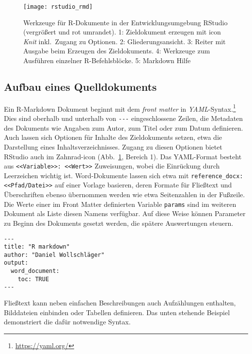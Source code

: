 \begin{figure}[ht]
\centering
\texttt{[image: rstudio\_rmd]}
\vspace*{-0.5em}
\caption{Werkzeuge für R-Dokumente in der Entwicklungsumgebung RStudio (vergrößert und rot umrandet). 1: Zieldokument erzeugen mit icon \emph{Knit} inkl.\ Zugang zu Optionen. 2: Gliederungsansicht. 3: Reiter mit Ausgabe beim Erzeugen des Zieldokuments. 4: Werkzeuge zum Ausführen einzelner R-Befehlsblöcke. 5: Markdown Hilfe}
\label{fig:rstudio_rmd}
\end{figure}

\subsection{Aufbau eines Quelldokuments}

Ein R-Markdown Dokument beginnt mit dem \emph{front matter} in \emph{YAML}-Syntax.\footnote{\url{https://yaml.org/}} Dies sind oberhalb und unterhalb von \lstinline!---! eingeschlossene Zeilen, die Metadaten des Dokuments wie Angaben zum Autor, zum Titel oder zum Datum definieren. Auch lassen sich Optionen für Inhalte des Zieldokuments setzen, etwa die Darstellung eines Inhaltsverzeichnisses. Zugang zu diesen Optionen bietet RStudio auch im Zahnrad-icon (Abb.\ \ref{fig:rstudio_rmd}, Bereich 1). Das YAML-Format besteht aus \lstinline!<<Variable>>: <<Wert>>! Zuweisungen, wobei die Einrückung durch Leerzeichen wichtig ist. Word-Dokumente lassen sich etwa mit \lstinline!reference_docx: <<Pfad/Datei>>! auf einer Vorlage basieren, deren Formate für Fließtext und Überschriften ebenso übernommen werden wie etwa Seitenzahlen in der Fußzeile. Die Werte einer im Front Matter definierten Variable \lstinline!params! sind im weiteren Dokument als Liste diesen Namens verfügbar. Auf diese Weise können Parameter zu Beginn des Dokuments gesetzt werden, die spätere Auswertungen steuern.
\begin{lstlisting}
---
title: "R markdown"
author: "Daniel Wollschläger"
output:
  word_document:
    toc: TRUE
---
\end{lstlisting}

Fließtext kann neben einfachen Beschreibungen auch Aufzählungen enthalten, Bilddateien einbinden oder Tabellen definieren. Das unten stehende Beispiel demonstriert die dafür notwendige Syntax.

